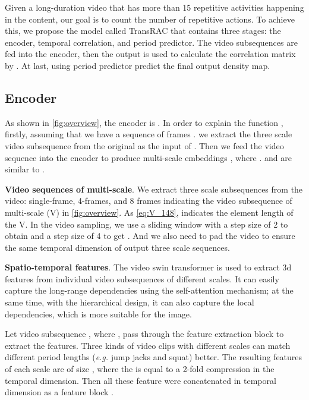 \documentclass[10pt,twocolumn,letterpaper]{article}
\begin{document}
\label{sec:TransRAC Model}
Given a long-duration video that has more than 15 repetitive activities happening in the content, our goal is to count the number of repetitive actions. To achieve this, we propose the model called TransRAC that contains three stages: the encoder, temporal correlation, and period predictor. The video subsequences  are fed into the encoder, then the output  is used to calculate the correlation matrix  by . At last, using period predictor  predict the final output density map.
\subsection{Encoder}

As shown in \cref{fig:overview}, the encoder is . In order to explain the function , firstly, assuming that we have a sequence of  frames . we extract the three scale video  subsequence  from the original as the input of . Then we feed the video sequence  into the encoder  to produce multi-scale embeddings , where .  and  are similar to . 

\noindent \textbf{Video sequences of multi-scale}. We extract three scale subsequences from the video: single-frame, 4-frames, and 8 frames indicating the video subsequence of multi-scale (V) in \cref{fig:overview}. As \cref{eq:V_148},  indicates the element length of the V. In the video sampling, we use a sliding window with a step size of 2 to obtain  and a step size of 4 to get . And we also need to pad the video to ensure the same temporal dimension of output three scale sequences.




\noindent \textbf{Spatio-temporal features}. The video swin transformer\cite{video-swin-transformer} is  used to extract 3d features from individual video subsequences of different scales. It can easily capture the long-range dependencies using the self-attention mechanism; at the same time, with the hierarchical design, it can also capture the local dependencies, which is more suitable for the image.

Let video subsequence , where , pass through the feature extraction block to extract the features. Three kinds of video clips with different scales can  match different period lengths (\emph{e.g.} jump jacks and squat) better. The resulting features of each scale are of size , where the  is equal to a 2-fold compression in the temporal dimension. Then all these feature were concatenated in temporal dimension as a feature block . 
\end{document}
